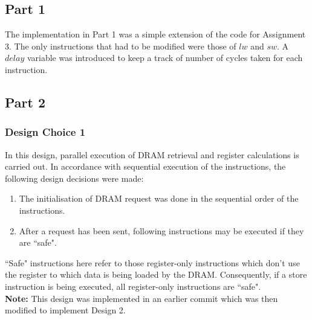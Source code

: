 \documentclass{article}
\begin{document}
\subsection{Part 1}
The implementation in Part 1 was a simple extension of the code for Assignment 3. The only instructions that had to be modified were those of $lw$ and $sw$. A $delay$ variable was introduced to keep a track of number of cycles taken for each instruction.

\subsection{Part 2}
\subsubsection{Design Choice 1}
In this design, parallel execution of DRAM retrieval and register calculations is carried out. In accordance with sequential execution of the instructions, the following design decisions were made:
\begin{enumerate}
    \item The initialisation of DRAM request was done in the sequential order of the instructions.
    \item After a request has been sent, following instructions may be executed if they are ``safe".
\end{enumerate}
``Safe" instructions here refer to those register-only instructions which don't use the register to which data is being loaded by the DRAM. Consequently, if a store instruction is being executed, all register-only instructions are ``safe".\\
\textbf{Note:} This design was implemented in an earlier commit which was then modified to implement Design 2.
\end{document}
